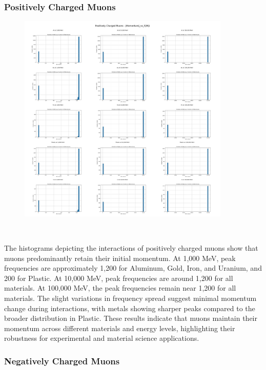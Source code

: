 \documentclass{article}
\begin{document}
\subsubsection{Positively Charged Muons}

\begin{figure}[H]
\centering
\includegraphics[width=0.9\textwidth]{images/Combined Plots/|Momentum|_vs_f(|M|)_mu+.png}
\end{figure}\

\noindent The histograms depicting the interactions of positively charged muons show that muons predominantly retain their initial momentum. At 1,000 MeV, peak frequencies are approximately 1,200 for Aluminum, Gold, Iron, and Uranium, and 200 for Plastic. At 10,000 MeV, peak frequencies are around 1,200 for all materials. At 100,000 MeV, the peak frequencies remain near 1,200 for all materials. The slight variations in frequency spread suggest minimal momentum change during interactions, with metals showing sharper peaks compared to the broader distribution in Plastic. These results indicate that muons maintain their momentum across different materials and energy levels, highlighting their robustness for experimental and material science applications.

\subsubsection{Negatively Charged Muons}
\end{document}
